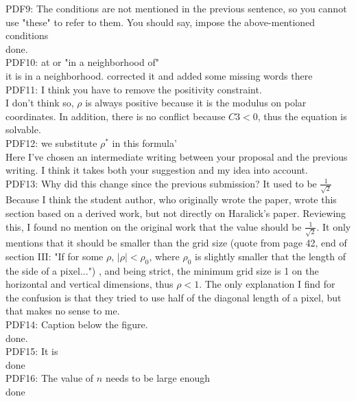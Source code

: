 \documentclass[a4paper,10pt]{report}
\begin{document}
\que PDF9: The conditions are not mentioned in the previous sentence, so you cannot use "these" to refer to them. You should say, impose the above-mentioned conditions\\
\ans done.\\

\que PDF10: at or "in a neighborhood of"\\
\ans it is in a neighborhood. corrected it and added some missing words there\\

\que PDF11: I think you have to remove the positivity constraint. \\
\ans I don't think so, $\rho$ is always positive because it is the modulus on polar coordinates. In addition, there is no conflict because $C3<0$, thus the equation is solvable.\\

\que PDF12: we substitute $\rho^*$ in this formula'\\
\ans Here I've chosen an intermediate writing between your proposal and the previous writing. I think it takes both your suggestion and my idea into account.\\

\que PDF13: Why did this change since the previous submission? It used to  be $\frac 1{\sqrt 2}$\\
\ans Because I think the student author, who originally wrote the paper, wrote this section based on a derived work, but not directly on Haralick's paper. Reviewing this, I found no mention on the original work that the value should be $\frac 1{\sqrt 2}$. It only mentions that it should be smaller than the grid size (quote from page 42, end of section III: "If for some $\rho$, $|\rho|<\rho_0$, where $\rho_0$ is slightly smaller that the length of the side of a pixel...") , and being strict, the minimum grid size is 1 on the horizontal and vertical dimensions, thus $\rho<1$. The only explanation I find for the confusion is that they tried to use half of the diagonal length of a pixel, but that makes no sense to me.\\

\que PDF14: Caption below the figure.\\
\ans done.\\

\que PDF15: It is\\
\ans done\\

\que PDF16: The value of $n$ needs to be large enough\\
\ans done\\
\end{document}
